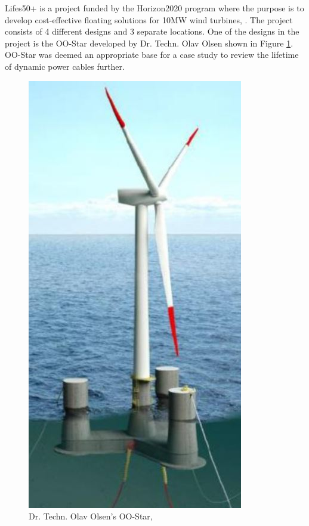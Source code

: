 \newline
\newline
Lifes50+ is a project funded by the Horizon2020 program where the purpose is to develop cost-effective floating solutions for 10MW wind turbines, \cite{Horizon2010}. The project consists of 4 different designs and 3 separate locations. One of the designs in the project is the OO-Star developed by Dr. Techn. Olav Olsen shown in Figure \ref{fig:oostarintro}. OO-Star was deemed an appropriate base for a case study to review the lifetime of dynamic power cables further.

\begin{figure}[H]
\centering
\includegraphics[scale=0.5]{figures/oostar}
\caption[$\; \:$Dr. Techn. Olav Olsen's OO-Star]{Dr. Techn. Olav Olsen's OO-Star, \cite{Lifes50+D4.2} }
 \label{fig:oostarintro}
\end{figure}



